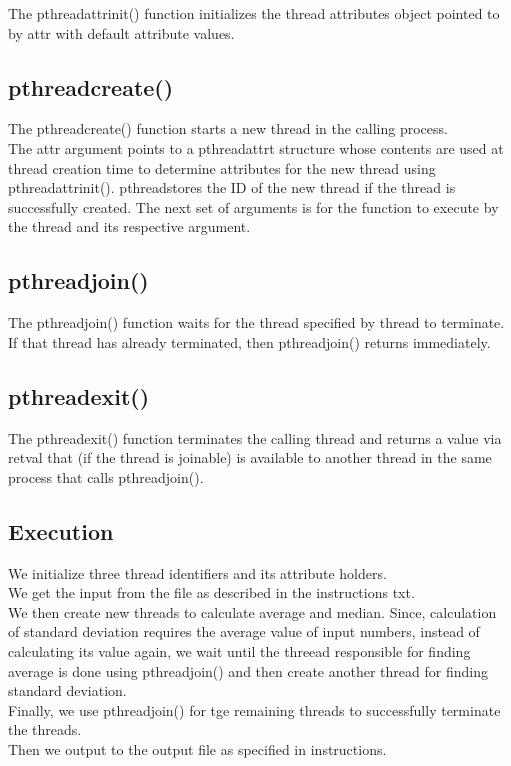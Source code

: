 \documentclass[12pt]{article}
\begin{document}
 The pthread\textunderscore attr\textunderscore init() function initializes the thread attributes object pointed to by attr with default attribute values.

\subsection{pthread\textunderscore create()}

The pthread\textunderscore create() function starts a new thread in the calling process.\\
The attr argument points to a pthread\textunderscore attr\textunderscore t structure whose contents are used at thread creation time to determine attributes for the new thread using pthread\textunderscore attr\textunderscore init().
pthread\textunderscore stores the ID of the new thread if the thread is successfully created.
The next set of arguments is for the function to execute by the thread and its respective argument.

\subsection{pthread\textunderscore join()}

The pthread\textunderscore join() function waits for the thread specified by thread to terminate.\\
If that thread has already terminated, then pthread\textunderscore join() returns immediately.

\subsection{pthread\textunderscore exit()}

The pthread\textunderscore exit() function terminates the calling thread and returns a value via retval that (if the thread is joinable) is available to another thread in the same process that calls pthread\textunderscore join().

\subsection{Execution}

We initialize three thread identifiers and its attribute holders.\\
We get the input from the file as described in the instructions txt.\\
We then create new threads to calculate average and median.
Since, calculation of standard deviation requires the average value of input numbers, instead of calculating its value again, we wait until the threead responsible for finding average is done using pthread\textunderscore join() and then create another thread for finding standard deviation.\\
Finally, we use pthread\textunderscore join() for tge remaining threads to successfully terminate the threads.\\
Then we output to the output file as specified in instructions.\\
\end{document}
